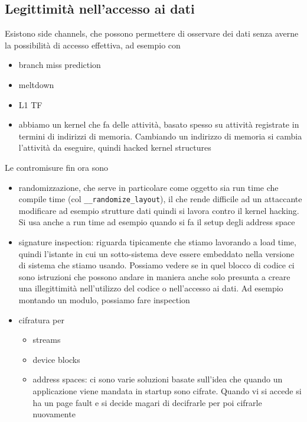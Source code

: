 \documentclass[12pt, oneside]{extbook}
\begin{document}
\subsection{Legittimità nell'accesso ai dati}
Esistono side channels, che possono permettere di osservare dei dati senza averne la possibilità di accesso effettiva, ad esempio con 
\begin{itemize}
	\item branch miss prediction
	\item meltdown
	\item L1 TF
	\item abbiamo un kernel che fa delle attività, basato spesso su attività registrate in termini di indirizzi di memoria. Cambiando un indirizzo di memoria si cambia l'attività da eseguire, quindi hacked kernel structures
\end{itemize}
Le contromisure fin ora sono
\begin{itemize}
	\item randomizzazione, che serve in particolare come oggetto sia run time che compile time (col \texttt{\_\_randomize\_layout}), il che rende difficile ad un attaccante modificare ad esempio strutture dati quindi si lavora contro il kernel hacking. Si usa anche a run time ad esempio quando si fa il setup degli address space
	\item signature inspection: riguarda tipicamente che stiamo lavorando a load time, quindi l'istante in cui un sotto-sistema deve essere embeddato nella versione di sistema che stiamo usando. Possiamo vedere se in quel blocco di codice ci sono istruzioni che possono andare in maniera anche solo presunta a creare una illegittimità nell'utilizzo del codice o nell'accesso ai dati. Ad esempio montando un modulo, possiamo fare inspection
	\item cifratura per
	\begin{itemize}
		\item streams
		\item device blocks
		\item address spaces: ci sono varie soluzioni basate sull'idea che quando un applicazione viene mandata in startup sono cifrate. Quando vi si accede si ha un page fault e si decide magari di decifrarle per poi cifrarle nuovamente
	\end{itemize}
\end{itemize}
\end{document}
